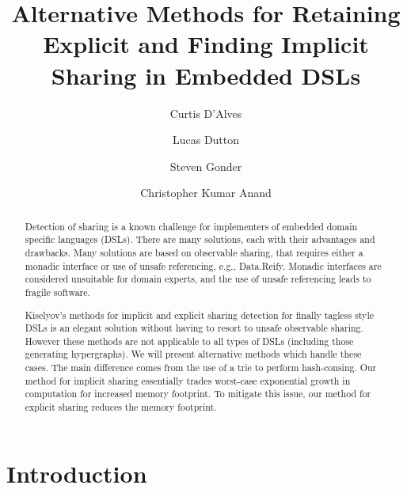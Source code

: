 \documentclass[runningheads]{llncs}
\begin{document}
\lstset{language=haskell}
%
\title{Alternative Methods for Retaining
    Explicit and Finding Implicit Sharing in Embedded DSLs}
%
%
\author{Curtis D'Alves \and
Lucas Dutton \and
Steven Gonder \and
Christopher Kumar Anand
}
%
%
%
\maketitle              %
%
\begin{abstract}
  Detection of sharing is a known challenge for implementers of embedded domain
  specific languages (DSLs). There are many solutions, each with their
  advantages and drawbacks. Many solutions are based on observable sharing, that
  requires either a monadic interface or use of unsafe referencing, e.g.,
  Data.Reify. Monadic interfaces are considered unsuitable for domain experts, and
  the use of unsafe referencing leads to fragile software.

  Kiselyov's methods for implicit and explicit sharing detection for finally
  tagless style DSLs is an elegant solution without having to resort to unsafe
  observable sharing. However these methods are not applicable to all types of
  DSLs (including those generating hypergraphs). We will present alternative
  methods which handle these cases. The main difference comes from the use of a
  trie to perform hash-consing. Our method for implicit sharing essentially
  trades worst-case exponential growth in computation for increased memory
  footprint. To mitigate this issue, our method for explicit sharing reduces the
  memory footprint.

\end{abstract}
%
%
%
\section{Introduction}
\end{document}
